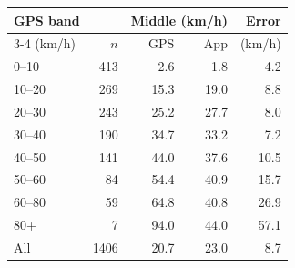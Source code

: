 \begin{tabular}{@{}lrrrr@{}}
\toprule
GPS band & & \multicolumn{2}{c}{Middle (km/h)} & Error\\
\cmidrule(lr){3-4}
(km/h) & $n$ & GPS & App & (km/h)\\
\midrule
0--10 & 413 & 2.6 & 1.8 & 4.2 \\
10--20 & 269 & 15.3 & 19.0 & 8.8 \\
20--30 & 243 & 25.2 & 27.7 & 8.0 \\
30--40 & 190 & 34.7 & 33.2 & 7.2 \\
40--50 & 141 & 44.0 & 37.6 & 10.5 \\
50--60 & 84 & 54.4 & 40.9 & 15.7 \\
60--80 & 59 & 64.8 & 40.8 & 26.9 \\
80+ & 7 & 94.0 & 44.0 & 57.1 \\
\midrule
All & 1406 & 20.7 & 23.0 & 8.7 \\
\bottomrule
\end{tabular}
